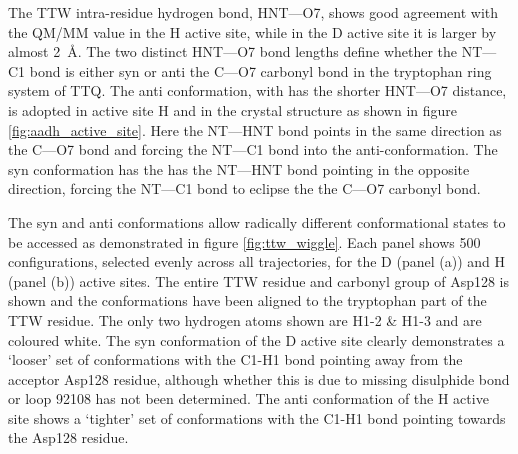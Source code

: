 The TTW intra-residue hydrogen bond, HNT---O7, shows good agreement with the QM/MM value in the H active site, while in the D active site it is larger by almost \SI{2}{\angstrom}. The two distinct HNT---O7 bond lengths define whether the NT---C1 bond is either syn or anti the C---O7 carbonyl bond in the tryptophan ring system of TTQ. The anti conformation, with has the shorter HNT---O7 distance, is adopted in active site H and in the crystal structure as shown in figure \ref{fig:aadh_active_site}.  Here the NT---HNT bond points in the same direction as the C---O7 bond and forcing the NT---C1 bond into the anti-conformation. The syn conformation has the has the NT---HNT bond pointing in the opposite direction, forcing the NT---C1 bond to eclipse the the C---O7 carbonyl bond. 

The syn and anti conformations allow radically different conformational states to be accessed as demonstrated in figure \ref{fig:ttw_wiggle}. Each panel shows \num{500} configurations, selected evenly across all trajectories, for the D (panel (a)) and H (panel (b)) active sites. The entire TTW residue and carbonyl group of Asp128 is shown and the conformations have been aligned to the tryptophan part of the TTW residue. The only two hydrogen atoms shown are H1-2 \& H1-3 and are coloured white. The syn conformation of the D active site clearly demonstrates a `looser' set of conformations with the  C1-H1 bond pointing away from the acceptor Asp128 residue, although whether this is due to missing disulphide bond or loop \num{92}{108} has not been determined. The anti conformation of the H active site shows a `tighter' set of conformations with the C1-H1 bond pointing towards the Asp128 residue. 

